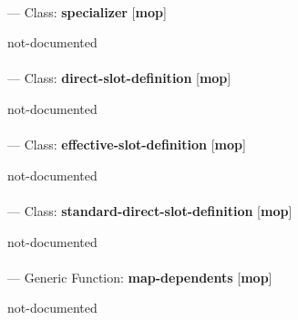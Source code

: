 \paragraph{}
\label{MOP:SPECIALIZER}
--- Class: \textbf{specializer} [\textbf{mop}] \textit{}

\begin{adjustwidth}{5em}{5em}
not-documented
\end{adjustwidth}

\paragraph{}
\label{MOP:DIRECT-SLOT-DEFINITION}
--- Class: \textbf{direct-slot-definition} [\textbf{mop}] \textit{}

\begin{adjustwidth}{5em}{5em}
not-documented
\end{adjustwidth}

\paragraph{}
\label{MOP:EFFECTIVE-SLOT-DEFINITION}
--- Class: \textbf{effective-slot-definition} [\textbf{mop}] \textit{}

\begin{adjustwidth}{5em}{5em}
not-documented
\end{adjustwidth}

\paragraph{}
\label{MOP:STANDARD-DIRECT-SLOT-DEFINITION}
--- Class: \textbf{standard-direct-slot-definition} [\textbf{mop}] \textit{}

\begin{adjustwidth}{5em}{5em}
not-documented
\end{adjustwidth}

\paragraph{}
\label{MOP:MAP-DEPENDENTS}
--- Generic Function: \textbf{map-dependents} [\textbf{mop}] \textit{}

\begin{adjustwidth}{5em}{5em}
not-documented
\end{adjustwidth}

